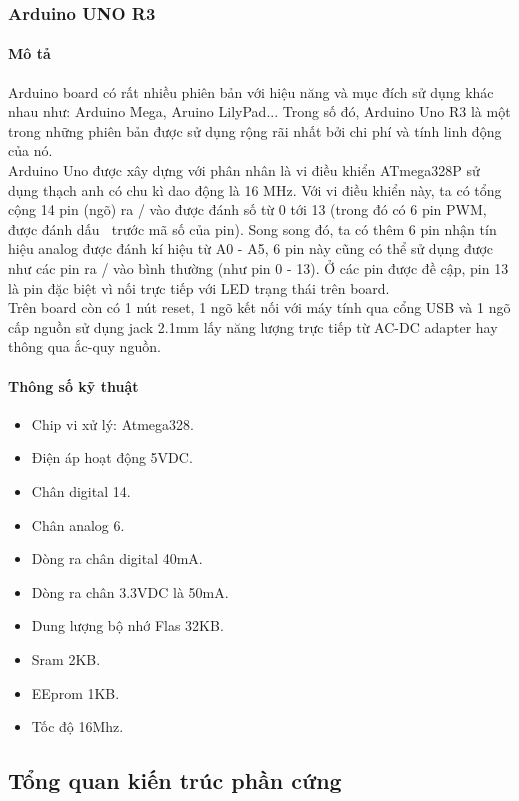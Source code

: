 \subsubsection{Arduino UNO R3}
\label{ref{fig3_4}}
\paragraph{Mô tả}
Arduino board có rất nhiều phiên bản với hiệu năng và mục đích sử dụng khác nhau như: Arduino Mega, Aruino LilyPad... Trong số đó, Arduino Uno R3 là một trong những phiên bản được sử dụng rộng rãi nhất bởi chi phí và tính linh động của nó.\\
Arduino Uno được xây dựng với phân nhân là vi điều khiển ATmega328P sử dụng thạch anh có chu kì dao động là 16 MHz. Với vi điều khiển này, ta có tổng cộng 14 pin (ngõ) ra / vào được đánh số từ 0 tới 13 (trong đó có 6 pin PWM, được đánh dấu $~$ trước mã số của pin). Song song đó, ta có thêm 6 pin nhận tín hiệu analog được đánh kí hiệu từ A0 - A5, 6 pin này cũng có thể sử dụng được như các pin ra / vào bình thường (như pin 0 - 13). Ở các pin được đề cập, pin 13 là pin đặc biệt vì nối trực tiếp với LED trạng thái trên board.\\
Trên board còn có 1 nút reset, 1 ngõ kết nối với máy tính qua cổng USB và 1 ngõ cấp nguồn sử dụng jack 2.1mm lấy năng lượng trực tiếp từ AC-DC adapter hay thông qua ắc-quy nguồn.\\
\paragraph{Thông số kỹ thuật}
\begin{itemize}
\item Chip vi xử lý: Atmega328.
\item Điện áp hoạt động 5VDC.
\item Chân digital 14.
\item Chân analog 6.
\item Dòng ra chân digital 40mA.
\item Dòng ra chân 3.3VDC là 50mA.
\item Dung lượng bộ nhớ Flas 32KB.
\item Sram 2KB.
\item EEprom 1KB.
\item Tốc độ 16Mhz.
\end{itemize}
\subsection{Tổng quan kiến trúc phần cứng}
\label{ref{fig3_8}}

